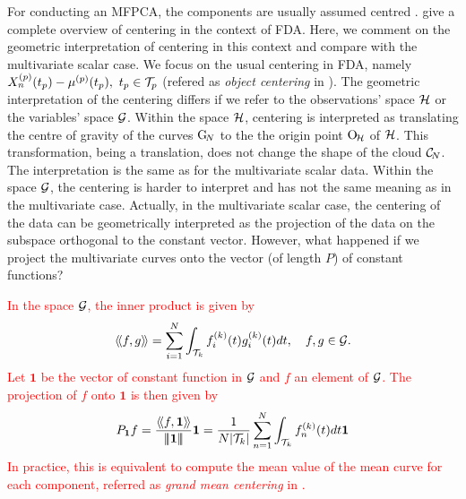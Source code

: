 For conducting an MFPCA, the components are usually assumed centred \citep{happMultivariateFunctionalPrincipal2018a}. \cite{protheroNewPerspectivesCentering2021} give a complete overview of centering in the context of FDA. Here, we comment on the geometric interpretation of centering in this context and compare with the multivariate scalar case. We focus on the usual centering in FDA, namely $X_n^{(p)}(t_p) - \mu^{(p)}(t_p),~t_p \in \mathcal{T}_{p}$ (refered as \emph{object centering} in \cite{protheroNewPerspectivesCentering2021}).
The geometric interpretation of the centering differs if we refer to the observations' space $\mathcal{H}$ or the variables' space $\mathcal{G}$. Within the space $\mathcal{H}$, centering is interpreted as translating the centre of gravity of the curves $\mathrm{G}_{\!N}$ to the the origin point $\mathrm{O}_{\!\mathcal{H}}$ of $\mathcal{H}$. This transformation, being a translation, does not change the shape of the cloud $\mathcal{C}_{\!N}$. The interpretation is the same as for the multivariate scalar data. Within the space $\mathcal{G}$, the centering is harder to interpret and has not the same meaning as in the multivariate case. Actually, in the multivariate scalar case, the centering of the data can be geometrically interpreted as the projection of the data on the subspace orthogonal to the constant vector. However, what happened if we project the multivariate curves onto the vector (of length $P$) of constant functions?


\textcolor{red}{In the space $\mathcal{G}$, the inner product is given by
\begin{equation}
\langle\!\langle f, g\rangle\!\rangle = \sum_{i = 1}^N \int_{\mathcal{T}_{k}} f^{(k)}_i(t)g^{(k)}_i(t)dt, \quad f, g \in \mathcal{G}.
\end{equation}
Let $\mathbf{1}$ be the vector of constant function in $\mathcal{G}$ and $f$ an element of $\mathcal{G}$. The projection of $f$ onto $\mathbf{1}$ is then given by
\begin{equation}
P_{\mathbf{1}}f = \frac{\langle\!\langle f, \mathbf{1}\rangle\!\rangle}{\left|\!\left|\!\left|\mathbf{1}\right|\!\right|\!\right|}\mathbf{1} = \frac{1}{N\lvert \mathcal{T}_{k} \rvert}\sum_{n = 1}^N \int_{\mathcal{T}_{k}} f^{(k)}_n(t)dt\mathbf{1}
\end{equation}
In practice, this is equivalent to compute the mean value of the mean curve for each component, referred as \emph{grand mean centering} in \cite{protheroNewPerspectivesCentering2021}.}

